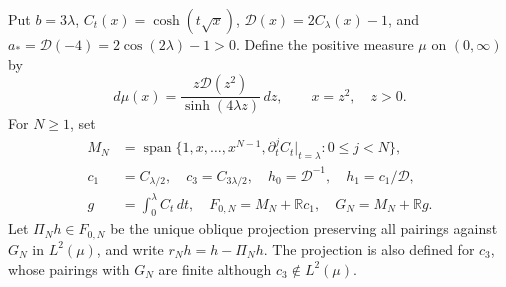 \documentclass[11pt]{article}
\numberwithin{equation}{section}
\theoremstyle{definition}\newtheorem{definition}[theorem]{Definition}
\theoremstyle{remark}\newtheorem{remark}[theorem]{Remark}
\begin{document}
Put $b=3\lambda$, $C_t(x)=\cosh(t\sqrt x)$,
$\mathcal D(x)=2C_\lambda(x)-1$, and
$a_*=\mathcal D(-4)=2\cos(2\lambda)-1>0$.
Define the positive measure $\mu$ on $(0,\infty)$ by
\begin{equation}\label{c:strip-measure}
 d\mu(x)=\frac{z\mathcal D(z^2)}{\sinh(4\lambda z)}\,dz,
 \qquad x=z^2,\quad z>0.
\end{equation}
For $N\ge1$, set
\[
 \begin{split}
 M_N&=\operatorname{span}\{1,x,\ldots,x^{N-1},
              \partial_t^j C_t|_{t=\lambda}:0\le j<N\},\\
 c_1&=C_{\lambda/2},\quad c_3=C_{3\lambda/2},\quad
 h_0=\mathcal D^{-1},\quad h_1=c_1/\mathcal D,\\
 g&=\int_0^\lambda C_t\,dt,
 \quad F_{0,N}=M_N+\mathbb R c_1,
 \quad G_N=M_N+\mathbb R g.
 \end{split}
\]
Let $\Pi_Nh\in F_{0,N}$ be the unique oblique projection preserving
all pairings against $G_N$ in $L^2(\mu)$, and write
$r_Nh=h-\Pi_Nh$.  The projection is also defined for $c_3$, whose
pairings with $G_N$ are finite although $c_3\notin L^2(\mu)$.
\end{document}

